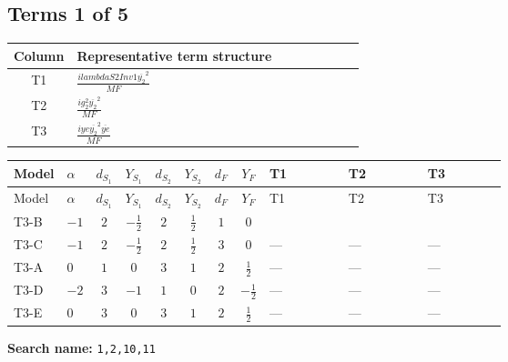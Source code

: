 \documentclass[8pt]{article}
\begin{document}
\begin{landscape}
\subsection*{Terms 1 of 5}
\begin{center}
\begin{tabular}{@{}c >{\raggedright\arraybackslash}p{0.82\linewidth}@{}}
\toprule
Column & Representative term structure \\
\midrule
T1 & \(\displaystyle \frac{i lambdaS2Inv1 \overline{y_{2}}^{2}}{MF}\) \\
\midrule
T2 & \(\displaystyle \frac{i g_{2}^{2} \overline{y_{2}}^{2}}{MF}\) \\
\midrule
T3 & \(\displaystyle \frac{i ye \overline{y_{2}}^{2} \overline{ye}}{MF}\) \\
\midrule
\bottomrule
\end{tabular}
\end{center}
\smallskip
\tiny
\begin{longtable}{@{}llcccccc >{\raggedright\arraybackslash}p{0.21\linewidth} >{\raggedright\arraybackslash}p{0.21\linewidth} >{\raggedright\arraybackslash}p{0.21\linewidth}@{}}
\toprule
Model & $\alpha$ & $d_{S_1}$ & $Y_{S_1}$ & $d_{S_2}$ & $Y_{S_2}$ & $d_F$ & $Y_F$ & T1 & T2 & T3 \\
\midrule
\endfirsthead
\toprule
Model & $\alpha$ & $d_{S_1}$ & $Y_{S_1}$ & $d_{S_2}$ & $Y_{S_2}$ & $d_F$ & $Y_F$ & T1 & T2 & T3 \\
\midrule
\endhead
T3-B & $-1$ & $2$ & $-\frac{1}{2}$ & $2$ & $\frac{1}{2}$ & $1$ & $0$ & \scriptsize\adjustbox{max width=\linewidth}{$\begin{gathered} \frac{i lambdaS2Inv1 \overline{y_{2}}^{2}}{4 MF}\end{gathered}$} & \scriptsize\adjustbox{max width=\linewidth}{$\begin{gathered} \frac{3 i g_{2}^{2} \overline{y_{2}}^{2}}{8 MF}\end{gathered}$} & \scriptsize\adjustbox{max width=\linewidth}{$\begin{gathered} - \frac{i ye \overline{y_{2}}^{2} \overline{ye}}{8 MF}\end{gathered}$} \\
\midrule
T3-C & $-1$ & $2$ & $-\frac{1}{2}$ & $2$ & $\frac{1}{2}$ & $3$ & $0$ & --- & --- & --- \\
\midrule
T3-A & $0$ & $1$ & $0$ & $3$ & $1$ & $2$ & $\frac{1}{2}$ & --- & --- & --- \\
\midrule
T3-D & $-2$ & $3$ & $-1$ & $1$ & $0$ & $2$ & $-\frac{1}{2}$ & --- & --- & --- \\
\midrule
T3-E & $0$ & $3$ & $0$ & $3$ & $1$ & $2$ & $\frac{1}{2}$ & --- & --- & --- \\
\midrule
\bottomrule
\end{longtable}
\clearpage
\noindent\textbf{Search name: }\texttt{1,2,10,11}\par\smallskip

\end{landscape}
\end{document}
